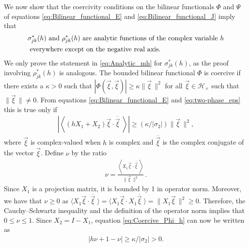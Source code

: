 \documentclass[11pt]{amsart}
\begin{document}
We now show that the coercivity conditions on the bilinear functionals
$\Phi$ and $\Psi$ of equations \eqref{eq:Bilinear_functional_E} and
\eqref{eq:Bilinear_functional_J} imply that
%
\begin{align}\label{eq:Analytic_mh}
  &\sigma^*_{jk}(h) \text{ and } \rho^*_{jk}(h) \text{ are analytic functions
    of the complex variable $h$}
    \\
    &\text{ everywhere except on the negative real
    axis.} \notag
\end{align}
% 
We only prove the statement in \eqref{eq:Analytic_mh} for $\sigma^*_{jk}(h)$, as
the proof involving $\rho^*_{jk}(h)$ is analogous. The bounded bilinear
functional $\Phi$ is coercive if there exists a $\kappa>0$ such that
$|\Phi(\vec{\xi},\vec{\xi})|\geq\kappa\|\vec{\xi}\,\|^2$ for all
$\vec{\xi}\in\mathscr{H}_\times$ such that $\|\vec{\xi}\,\|\neq0$. From equations
\eqref{eq:Bilinear_functional_E} and \eqref{eq:two-phase_eps} this is
true only if  
%
\begin{align}\label{eq:Coercive_Phi_h}
  \left|
    \left\langle(hX_1+X_2)\vec{\xi}\cdot\overline{\vec{\xi}}\;\right\rangle
  \right|\geq (\kappa/|\sigma_2|)\|\vec{\xi}\,\|^2,
\end{align}
%
where $\vec{\xi}$ is complex-valued when $h$ is complex and
$\overline{\vec{\xi}}$ is the complex conjugate of the 
vector $\vec{\xi}$. Define $\nu$ by the ratio 
%
\begin{align} 
  \nu=\frac{\left\langle X_1\vec{\xi}\cdot\overline{\vec{\xi}}\;\right\rangle}          
         {\|\vec{\xi}\,\|^2}\,.
\end{align}
%
Since $X_1$ is a projection matrix, it is bounded by 1 in
operator norm. Moreover, we have that $\nu\geq0$ as
$\langle X_1\vec{\xi}\cdot\overline{\vec{\xi}}\;\rangle
=\langle X_1\vec{\xi}\cdot X_1\overline{\vec{\xi}}\;\rangle=\|X_1\vec{\xi}\,\|^2\geq0$.
Therefore, the Cauchy--Schwartz inequality and the definition of the
operator norm \cite{Folland:99} implies that $0\leq\nu\leq1$. Since
$X_2=I-X_1$, equation \eqref{eq:Coercive_Phi_h} can now be
written as
% 
\begin{align}\label{eq:Coercive_Phi_h_beta}
  |h\nu+1-\nu|\geq\kappa/|\sigma_2|>0.
\end{align}
%
\end{document}
